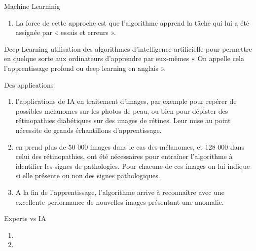 {\begin{frame}{Machine Learninig}
\begin{enumerate}[<+-|alert@+>][$\blacksquare$]
        \item
        La force de cette approche est que l'algorithme apprend la
        tâche qui lui a été assignée par « essais et erreurs ».
    \end{enumerate}
\end{frame}

\begin{frame}{Deep Learning}
    utilisation des algorithmes d'intelligence artificielle pour permettre
    en quelque sorte aux ordinateurs d'apprendre par eux-mêmes « On
    appelle cela l'apprentissage profond ou deep learning en anglais ».
\end{frame}

\begin{frame}{Des applications}
    \begin{enumerate}[<+-|alert@+>][$\blacksquare$]
        \item
        l'applications de IA en traitement d'images, par exemple pour repérer de
        possibles mélanomes sur les photos de peau, ou bien pour dépister des
        rétinopathies diabétiques sur des images de rétines. Leur mise au point
        nécessite de grands échantillons d'apprentissage.
        \item
        en prend plus de 50 000 images dans le cas des mélanomes, et 128 000
        dans celui des rétinopathies, ont été nécessaires pour entraîner
        l'algorithme à identifier les signes de pathologies. Pour chacune
        de ces images on lui indique si elle présente ou non des signes
        pathologiques.
        \item
        A la fin de l'apprentissage, l'algorithme arrive à
        reconnaître avec une excellente performance de nouvelles images
        présentant une anomalie. 
    \end{enumerate}
\end{frame}


\begin{frame}{Experts  vs IA}
    \begin{enumerate}[]
        \item {}

        \item {}
            \vspace{80mm}
    \end{enumerate}
\end{frame}
}
